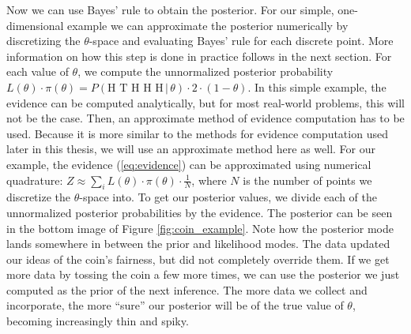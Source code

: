 \documentclass[12pt, a4paper]{report}
\begin{document}
Now we can use Bayes' rule to obtain the posterior.
For our simple, one-dimensional example we can approximate the posterior numerically by discretizing the $\theta$-space and evaluating Bayes' rule for each discrete point.
More information on how this step is done in practice follows in the next section.
For each value of $\theta$, we compute the unnormalized posterior probability $L(\theta) \cdot \pi(\theta) = P(\textrm{H T H H H} \, | \, \theta) \cdot 2 \cdot (1 - \theta)$.
In this simple example, the evidence can be computed analytically, but for most real-world problems, this will not be the case.
Then, an approximate method of evidence computation has to be used.
Because it is more similar to the methods for evidence computation used later in this thesis, we will use an approximate method here as well.
For our example, the evidence (\ref{eq:evidence}) can be approximated using numerical quadrature: $Z \approx \sum_{i} L(\theta) \cdot \pi(\theta) \cdot \frac{1}{N}$, where $N$ is the number of points we discretize the $\theta$-space into.
To get our posterior values, we divide each of the unnormalized posterior probabilities by the evidence.
The posterior can be seen in the bottom image of Figure \ref{fig:coin_example}.
Note how the posterior mode lands somewhere in between the prior and likelihood modes.
The data updated our ideas of the coin's fairness, but did not completely override them.
If we get more data by tossing the coin a few more times, we can use the posterior we just computed as the prior of the next inference.
The more data we collect and incorporate, the more ``sure'' our posterior will be of the true value of $\theta$, becoming increasingly thin and spiky.
\end{document}
